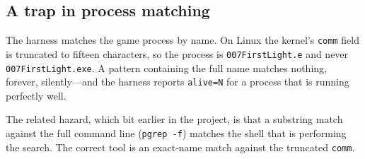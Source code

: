 \subsection{A trap in process matching}

The harness matches the game process by name. On Linux the kernel's \verb|comm|
field is truncated to fifteen characters, so the process is
\verb|007FirstLight.e| and never \verb|007FirstLight.exe|. A pattern containing
the full name matches nothing, forever, silently---and the harness reports
\verb|alive=N| for a process that is running perfectly well.

The related hazard, which bit earlier in the project, is that a substring match
against the full command line (\verb|pgrep -f|) matches the shell that is
performing the search. The correct tool is an exact-name match against the
truncated \verb|comm|.
